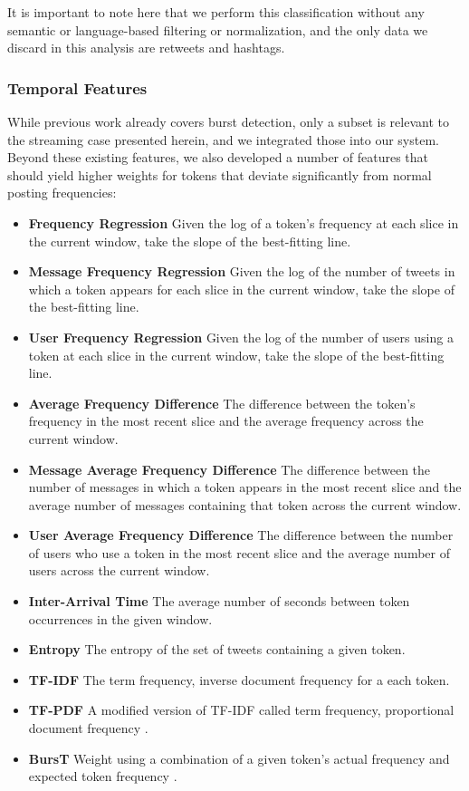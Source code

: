 \documentclass{acm_proc_article-sp}
\begin{document}
It is important to note here that we perform this classification without any semantic or language-based filtering or normalization, and the only data we discard in this analysis are retweets and hashtags.

\subsubsection{Temporal Features}

While previous work already covers burst detection, only a subset is relevant to the streaming case presented herein, and we integrated those into our system.
Beyond these existing features, we also developed a number of features that should yield higher weights for tokens that deviate significantly from normal posting frequencies:

\begin{itemize}
\item \textbf{Frequency Regression} Given the log of a token's frequency at each slice in the current window, take the slope of the best-fitting line.
\item \textbf{Message Frequency Regression} Given the log of the number of tweets in which a token appears for each slice in the current window, take the slope of the best-fitting line.
\item \textbf{User Frequency Regression} Given the log of the number of users using a token at each slice in the current window, take the slope of the best-fitting line.
\item \textbf{Average Frequency Difference} The difference between the token's frequency in the most recent slice and the average frequency across the current window.
\item \textbf{Message Average Frequency Difference} The difference between the number of messages in which a token appears in the most recent slice and the average number of messages containing that token across the current window.
\item \textbf{User Average Frequency Difference} The difference between the number of users who use a token in the most recent slice and the average number of users across the current window.
\item \textbf{Inter-Arrival Time} The average number of seconds between token occurrences in the given window.
\item \textbf{Entropy} The entropy of the set of tweets containing a given token.
\item \textbf{TF-IDF} The term frequency, inverse document frequency for a each token.
\item \textbf{TF-PDF} A modified version of TF-IDF called term frequency, proportional document frequency \cite{Bun:2002:TEN:645962.674082}.
\item \textbf{BursT} Weight using a combination of a given token's actual frequency and expected token frequency \cite{Lee:2011:BDT:2009463.2009531}.
\end{itemize}
\end{document}
